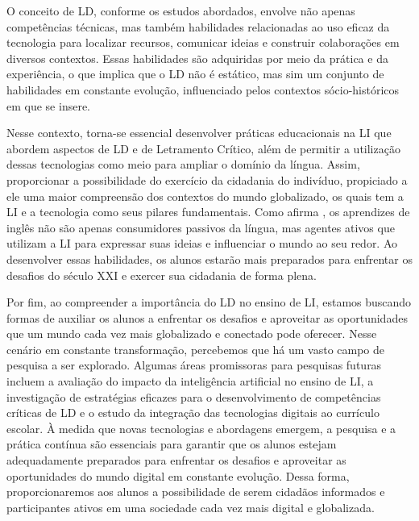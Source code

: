 O conceito de LD, conforme os estudos abordados, envolve não apenas competências técnicas, mas também habilidades relacionadas ao uso eficaz da tecnologia para localizar recursos, comunicar ideias e construir colaborações em diversos contextos. Essas habilidades são adquiridas por meio da prática e da experiência, o que implica que o LD não é estático, mas sim um conjunto de habilidades em constante evolução, influenciado pelos contextos sócio-históricos em que se insere.

Nesse contexto, torna-se essencial desenvolver práticas educacionais na LI que abordem aspectos de LD e de Letramento Crítico, além de permitir a utilização dessas tecnologias como meio para ampliar o domínio da língua. Assim, proporcionar a possibilidade do exercício da cidadania do indivíduo, propiciado a ele uma maior compreensão dos contextos do mundo globalizado, os quais tem a LI e a tecnologia como seus pilares fundamentais. Como afirma \textcite{warschauer2000changing}, os aprendizes de inglês não são apenas consumidores passivos da língua, mas agentes ativos que utilizam a LI para expressar suas ideias e influenciar o mundo ao seu redor. Ao desenvolver essas habilidades, os alunos estarão mais preparados para enfrentar os desafios do século XXI e exercer sua cidadania de forma plena.

Por fim, ao compreender a importância do LD no ensino de LI, estamos buscando formas de auxiliar os alunos a enfrentar os desafios e aproveitar as oportunidades que um mundo cada vez mais globalizado e conectado pode oferecer. Nesse cenário em constante transformação, percebemos que há um vasto campo de pesquisa a ser explorado. Algumas áreas promissoras para pesquisas futuras incluem a avaliação do impacto da inteligência artificial no ensino de LI, a investigação de estratégias eficazes para o desenvolvimento de competências críticas de LD e o estudo da integração das tecnologias digitais ao currículo escolar. À medida que novas tecnologias e abordagens emergem, a pesquisa e a prática contínua são essenciais para garantir que os alunos estejam adequadamente preparados para enfrentar os desafios e aproveitar as oportunidades do mundo digital em constante evolução. Dessa forma, proporcionaremos aos alunos a possibilidade de serem cidadãos informados e participantes ativos em uma sociedade cada vez mais digital e globalizada.
